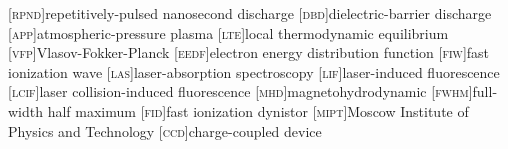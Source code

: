[\textsc{rpnd}]{repetitively-pulsed nanosecond discharge}
[\textsc{dbd}]{dielectric-barrier discharge}
[\textsc{app}]{atmospheric-pressure plasma}
[\textsc{lte}]{local thermodynamic equilibrium}
[\textsc{vfp}]{Vlasov-Fokker-Planck}
[\textsc{eedf}]{electron energy distribution function}
[\textsc{fiw}]{fast ionization wave}
[\textsc{las}]{laser-absorption spectroscopy}
[\textsc{lif}]{laser-induced fluorescence}
[\textsc{lcif}]{laser collision-induced fluorescence}
[\textsc{mhd}]{magnetohydrodynamic}
[\textsc{fwhm}]{full-width half maximum}
[\textsc{fid}]{fast ionization dynistor}
[\textsc{mipt}]{Moscow Institute of Physics and Technology}
[\textsc{ccd}]{charge-coupled device}
